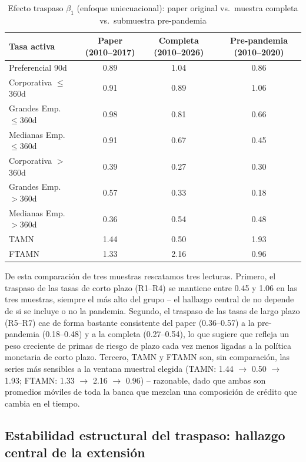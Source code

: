 \documentclass[12pt, letterpaper]{article}
\begin{document}
\begin{table}[ht]
\renewcommand{\thetable}{16}
\caption{Efecto traspaso $\beta_1$ (enfoque uniecuacional): paper
         original vs.\ muestra completa vs.\ submuestra pre-pandemia}
\label{tab:comparatres}
\centering
\small
\begin{tabular}{lccc}
\toprule
Tasa activa & Paper (2010--2017) & Completa (2010--2026) & Pre-pandemia (2010--2020) \\
\midrule
Preferencial 90d         & 0.89 & 1.04 & 0.86 \\
Corporativa $\le$360d    & 0.91 & 0.89 & 1.06 \\
Grandes Emp.\ $\le$360d  & 0.98 & 0.81 & 0.66 \\
Medianas Emp.\ $\le$360d & 0.91 & 0.67 & 0.45 \\
Corporativa $>$360d      & 0.39 & 0.27 & 0.30 \\
Grandes Emp.\ $>$360d    & 0.57 & 0.33 & 0.18 \\
Medianas Emp.\ $>$360d   & 0.36 & 0.54 & 0.48 \\
TAMN                     & 1.44 & 0.50 & 1.93 \\
FTAMN                    & 1.33 & 2.16 & 0.96 \\
\bottomrule
\end{tabular}
\end{table}

De esta comparación de tres muestras rescatamos tres lecturas. Primero,
el traspaso de las tasas de corto plazo (R1--R4) se mantiene entre 0.45
y 1.06 en las tres muestras, siempre el más alto del grupo -- el
hallazgo central de \textcite{lahura2017} no depende de si se incluye o
no la pandemia. Segundo, el traspaso de las tasas de largo plazo
(R5--R7) cae de forma bastante consistente del paper (0.36--0.57) a la
pre-pandemia (0.18--0.48) y a la completa (0.27--0.54), lo que sugiere
que refleja un peso creciente de primas de riesgo de plazo cada vez
menos ligadas a la política monetaria de corto plazo. Tercero, TAMN y
FTAMN son,
sin comparación, las series más sensibles a la ventana muestral
elegida (TAMN: 1.44 $\to$ 0.50 $\to$ 1.93; FTAMN: 1.33 $\to$ 2.16
$\to$ 0.96) -- razonable, dado que ambas son promedios móviles de toda
la banca que mezclan una composición de crédito que cambia en el
tiempo.

\subsection{Estabilidad estructural del traspaso: hallazgo central
            de la extensión}
\end{document}
